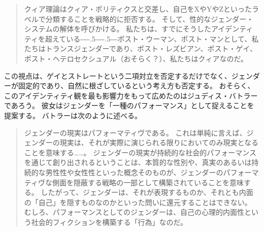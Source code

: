 \documentclass[paper=a4,book,openany]{jlreq}
\newcommand{\ig}[1]{}           %
\def\DDASH{―\kern-.5\zw―\kern-.5\zw―}
\begin{document}
\begin{quote}
クィア理論はクィア・ポリティクスと交差し、自己をXやYやZといったラベルで分類することを戦略的に拒否する。
そして、性的なジェンダー・システムの解体を呼びかける。
私たちは、すでにそうしたアイデンティティを超えている{\DDASH}ポスト・ウーマン、ポスト・マンとして、私たちはトランスジェンダーであり、ポスト・レズビアン、ポスト・ゲイ、ポスト・ヘテロセクシュアル（おそらく？）、私たちはクィアなのだ。
\citep[p.38]{richardson00:_rethin_sexual}
\end{quote}

この視点は、ゲイとストレートという二項対立を否定するだけでなく、ジェンダーが固定的であり、自然に根ざしているという考え方も否定する。
おそらく、このアイデンティティ観を最も影響力をもって広めたのはジュディス・バトラー\ig{(Judith Butler)}であろう。
彼女はジェンダーを「一種のパフォーマンス」として捉えることを提案する。
バトラーは次のように述べる。

\begin{quote}
ジェンダーの現実はパフォーマティヴである。
これは単純に言えば、ジェンダーの現実は、それが実際に演じられる限りにおいてのみ現実となることを意味する……。
ジェンダーの現実が持続的な社会的パフォーマンスを通じて創り出されるということは、本質的な性別や、真実のあるいは持続的な男性性や女性性といった概念そのものが、ジェンダーのパフォーマティヴな側面を隠蔽する戦略の一部として構築されていることを意味する。
したがって、ジェンダーは、それが表現するものか、それとも内面の「自己」を隠すものなのかといった問いに還元することはできない。
むしろ、パフォーマンスとしてのジェンダーは、自己の心理的内面性という社会的フィクションを構築する「行為」なのだ。\citep[pp. 527-528]{butler88:_perfor_acts_gender_const}

\end{quote}
\end{document}
